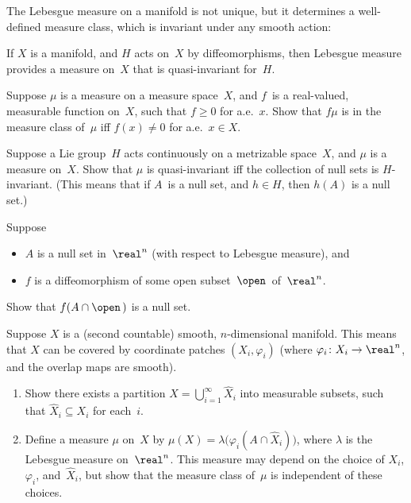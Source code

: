 The Lebesgue measure on a manifold is not unique, but it determines a well-defined measure class, which is invariant under any smooth action:

\begin{lem}
If $X$ is a manifold, and $H$ acts on~$X$ by diffeomorphisms, then Lebesgue measure provides a measure on~$X$ that is quasi-invariant for~$H$.
\end{lem}

\begin{exercises}

\item \label{fmuClassOfMuEx}
Suppose $\mu$ is a measure on a measure space~$X$, and $f$~is a real-valued, measurable function on~$X$, such that $f \ge 0$ for a.e.~$x$. Show that $f \mu$ is in the measure class of~$\mu$ iff $f(x) \neq 0$ for a.e.\ $x \in X$.

\item Suppose a Lie group~$H$ acts continuously on a metrizable space~$X$, and $\mu$ is a measure on~$X$. Show that $\mu$ is quasi-invariant iff the collection of null sets is $H$-invariant. (This means that if $A$~is a null set, and $h \in H$, then $h(A)$ is a null set.)

\item \label{Diffble(null)=nullEx}
Suppose 
	\begin{itemize}
	\item $A$ is a null set in~$\real^n$ (with respect to Lebesgue measure),
	and
	\item $f$ is a diffeomorphism of some open subset~$\open$\, of~$\real^n$.
	\end{itemize}
Show that $f(A \cap \open\,)$ is a null set.

\item \label{LebesgueMeasClassEx}
Suppose $X$ is a (second countable) smooth, $n$-dimensional manifold. This means that $X$ can be covered by coordinate patches $(X_i,\varphi_i)$ (where $\varphi_i \colon X_i \to \real^n$, and the overlap maps are smooth).
	\begin{enumerate}
	\item Show there exists a partition $X = \bigcup_{i=1}^\infty \hat X_i$ into measurable subsets, such that $\hat X_i \subseteq X_i$ for each~$i$.
	\item Define a measure $\mu$ on~$X$ by $\mu(X) = \lambda \bigl( \varphi_i(A \cap \hat X_i) \bigr)$, where $\lambda$ is the Lebesgue measure on~$\real^n$. This measure may depend on the choice of $X_i$, $\varphi_i$, and~$\hat X_i$, but show that the measure class of~$\mu$ is independent of these choices. 
	\end{enumerate}

\end{exercises}



